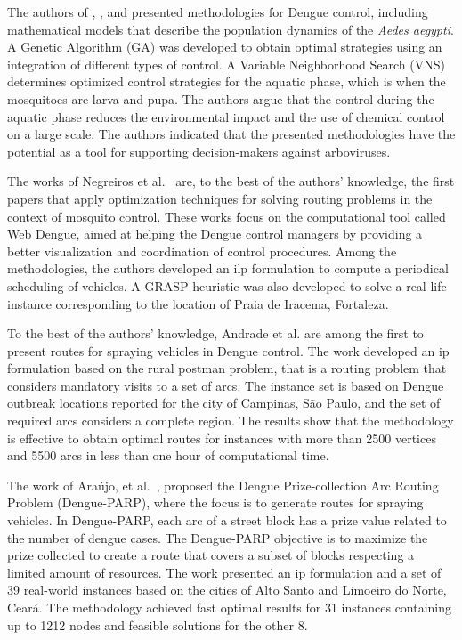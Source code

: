 The authors of \cite{dosreis:2018}, \cite{florentino:2018}, and
\cite{florentino-b:2018} presented methodologies for Dengue control, including
mathematical models that describe the population dynamics of the \textit{Aedes
aegypti}. A Genetic Algorithm (GA) was developed to obtain optimal strategies
using an integration of different types of control. A Variable Neighborhood
Search (VNS) determines optimized control strategies for the aquatic phase,
which is when the mosquitoes are larva and pupa. The authors argue that the
control during the aquatic phase reduces the environmental impact and the use of
chemical control on a large scale. The authors indicated that the presented
methodologies have the potential as a tool for supporting decision-makers
against arboviruses.

The works of Negreiros et
al.~\cite{negreiros:2008,negreiros:2011,negreiros-2020} are, to the best of the
authors' knowledge, the first papers that apply optimization techniques for
solving routing problems in the context of mosquito control. These works focus
on the computational tool called Web Dengue, aimed at helping the Dengue control
managers by providing a better visualization and coordination of control
procedures. Among the methodologies, the authors developed an \gls{ilp}
formulation to compute a periodical scheduling of vehicles. A GRASP heuristic
was also developed to solve a real-life instance corresponding to the location
of Praia de Iracema, Fortaleza.

To the best of the authors' knowledge, Andrade et al. \cite{andrade:2021} are
among the first to present routes for spraying vehicles in Dengue control. The work
developed an \gls{ip} formulation based on the rural postman problem, that is a
routing problem that considers mandatory visits to a set of arcs. The instance
set is based on Dengue outbreak locations reported for the city of Campinas, São
Paulo, and the set of required arcs considers a complete region. The results show
that the methodology is effective to obtain optimal routes for instances with
more than 2500 vertices and 5500 arcs in less than one hour of computational
time.

The work of Araújo, et al.~\cite{araujo:2022},
proposed the Dengue Prize-collection Arc Routing Problem (Dengue-PARP), where
the focus is to generate routes for spraying vehicles. In Dengue-PARP, each arc
of a street block has a prize value related to the number of dengue cases. The
Dengue-PARP objective is to maximize the prize collected to create a route that
covers a subset of blocks respecting a limited amount of resources. The work
presented an \gls{ip} formulation and a set of 39 real-world instances based on
the cities of Alto Santo and Limoeiro do Norte, Ceará. The methodology achieved
fast optimal results for 31 instances containing up to 1212 nodes and feasible
solutions for the other 8.

